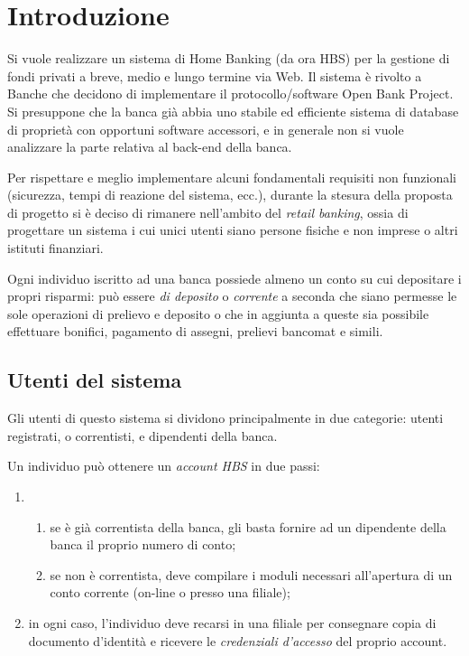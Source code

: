 \section{Introduzione}

Si vuole realizzare un sistema di Home Banking (da ora HBS) per la gestione di fondi privati a breve, medio e lungo termine via Web. Il sistema è rivolto a Banche che decidono di implementare il protocollo/software Open Bank Project. Si presuppone che la banca già abbia uno stabile ed efficiente sistema di database di proprietà con opportuni software accessori, e in generale non si vuole analizzare la parte relativa al back-end della banca.  

Per rispettare e meglio implementare alcuni fondamentali requisiti non funzionali (sicurezza, tempi di reazione del sistema, ecc.), durante la stesura della proposta di progetto si è deciso di rimanere nell'ambito del \emph{retail banking}, ossia di progettare un sistema i cui unici utenti siano persone fisiche e non imprese o altri istituti finanziari.

Ogni individuo iscritto ad una banca possiede almeno un conto su cui depositare i propri risparmi: può essere \emph{di deposito} o \emph{corrente} a seconda che siano permesse le sole operazioni di prelievo e deposito o che in aggiunta a queste sia possibile  effettuare bonifici, pagamento di assegni, prelievi bancomat e simili.

\subsection{Utenti del sistema}

Gli utenti di questo sistema si dividono principalmente in due categorie: utenti registrati, o correntisti, e dipendenti della banca. 

Un individuo può ottenere un \emph{account HBS} in due passi:
\begin{enumerate}
	\item
	\begin{enumerate}
		\item se è già correntista della banca, gli basta fornire ad un dipendente della banca il proprio numero di conto;
		\item se non è correntista, deve compilare i moduli necessari all'apertura di un conto corrente (on-line o presso una filiale);
	\end{enumerate}
	\item in ogni caso, l'individuo deve recarsi in una filiale per consegnare copia di documento d'identità e ricevere le 					\emph{credenziali d'accesso} del proprio account.
\end{enumerate}


